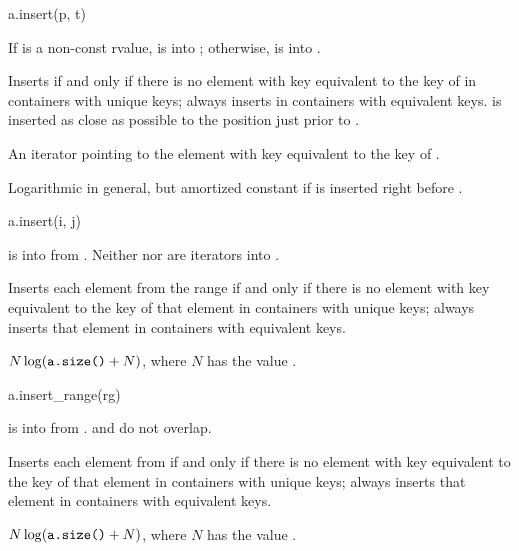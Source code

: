 %
\begin{itemdecl}
a.insert(p, t)
\end{itemdecl}

\begin{itemdescr}
\pnum
\result
{}

\pnum
\expects
If  is a non-const rvalue,
 is  into ;
otherwise,  is  into .

\pnum
\effects
Inserts  if and only if there is no element
with key equivalent to the key of  in containers with unique keys;
always inserts  in containers with equivalent keys.
 is inserted as close as possible to
the position just prior to .

\pnum
\returns
An iterator pointing to the element with key equivalent to the key of .

\pnum
\complexity
Logarithmic in general, but
amortized constant if  is inserted right before .
\end{itemdescr}

%
\begin{itemdecl}
a.insert(i, j)
\end{itemdecl}

\begin{itemdescr}
\pnum
\result
{}

\pnum
\expects
{} is
 into  from .
Neither  nor  are iterators into .

\pnum
\effects
Inserts each element from the range 
if and only if there is no element
with key equivalent to the key of that element in containers with unique keys;
always inserts that element in containers with equivalent keys.

\pnum
\complexity
$N \log (\texttt{a.size()} + N)$, where $N$ has the value .
\end{itemdescr}

%
\begin{itemdecl}
a.insert_range(rg)
\end{itemdecl}

\begin{itemdescr}
\pnum
\result
{}

\pnum
\expects
{} is
 into 
from .
 and  do not overlap.

\pnum
\effects
Inserts each element from  if and only if
there is no element with key equivalent to the key of that element
in containers with unique keys;
always inserts that element in containers with equivalent keys.

\pnum
\complexity
$N \log (\texttt{a.size()} + N)$,
where $N$ has the value .
\end{itemdescr}

